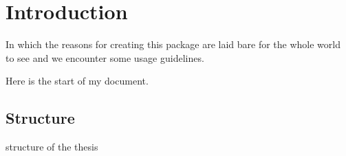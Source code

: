 
\chapter{Introduction}


\begin{center}
  \begin{minipage}{0.5\textwidth}
    \begin{small}
      In which the reasons for creating this package are laid bare for the
      whole world to see and we encounter some usage guidelines.
    \end{small}
  \end{minipage}
  \vspace{0.5cm}
\end{center}


Here is the start of my document.




\section{Structure}

structure of the thesis


